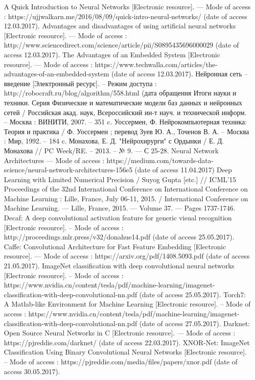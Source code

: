 \documentclass[a4paper,english,russian]{G2-105}
\begin{document}
\begin{thebibliography}{1}
	 A Quick Introduction to Neural Networks [Electronic resource]. --- Mode of access : https://ujjwalkarn.me/2016/08/09/quick-intro-neural-networks/ (date of access 12.03.2017).
	 Advantages and disadvantages of using artificial neural networks [Electronic resource]. --- Mode of access : http://www.sciencedirect.com/science/article/pii/S0895435696000029 (date of access 12.03.2017).
	 The Advantages of an Embedded System [Electronic resource]. --- Mode of access : https://www.techwalla.com/articles/the-advantages-of-an-embedded-system (date of access 12.03.2017).
     Нейронная сеть – введение [Электронный ресурс]. – Режим доступа : http://robocraft.ru/blog/algorithm/558.html (дата обращения
     Итоги науки и техники. Серия Физические и математические модели баз данных и нейронных сетей / Российская акад. наук, Всероссийский ин-т науч. и технической информ. – Москва : ВИНИТИ, 2007. – 351 c.
     Уоссермен, Ф. Нейрокомпьютерная техника: Теория и практика / Ф. Уоссермен ; перевод Зуев Ю. А., Точенов В. А. – Москва : Мир, 1992. – 184 c.
     Монахова, Е. Д. "Нейрохирурги" с Ордынки / Е. Д. Монахова // PC Week/RE. – 2013. – № 9. --- С 25-28.
      Neural Network Architectures — Mode of access :
https://medium.com/towards-data-science/neural-network-architectures-156e5
(date of access 11.04.2017)
     Deep Learning with Limited Numerical Precision / Suyog Gupta
[etc.] // ICML’15 Proceedings of the 32nd International Conference on
International Conference on Machine Learning : Lille, France, July 06-11,
2015. / International Conference on Machine Learning. — Lille, France, 2015. —  Volume 37. — Pages 1737-1746.
     Decaf: A deep convolutional activation feature for generic visual recognition [Electronic resource]. – Mode of access : http://proceedings.mlr.press/v32/donahue14.pdf (date of access 25.05.2017).
     Caffe: Convolutional Architecture for Fast Feature Embedding [Electronic resource]. --- Mode of access : https://arxiv.org/pdf/1408.5093.pdf (date of access 21.05.2017).
     ImageNet classification with deep convolutional neural networks [Electronic resource]. – Mode of access : https://www.nvidia.cn/content/tesla/pdf/machine-learning/imagenet-classification-with-deep-convolutional-nn.pdf (date of access 25.05.2017).
     Torch7: A Matlab-like Environment for Machine Learning [Electronic resource]. –  Mode of access : https://www.nvidia.cn/content/tesla/pdf/machine-learning/imagenet-classification-with-deep-convolutional-nn.pdf (date of access 27.05.2017).
     Darknet: Open Source Neural Networks in C [Electronic resource].
— Mode of access : https://pjreddie.com/darknet/ (date of access 22.03.2017).
     XNOR-Net: ImageNet Classification Using Binary Convolutional Neural Networks [Electronic resource]. – Mode of access : https://pjreddie.com/media/files/papers/xnor.pdf (date of access 30.05.2017).


\end{thebibliography}
\end{document}
